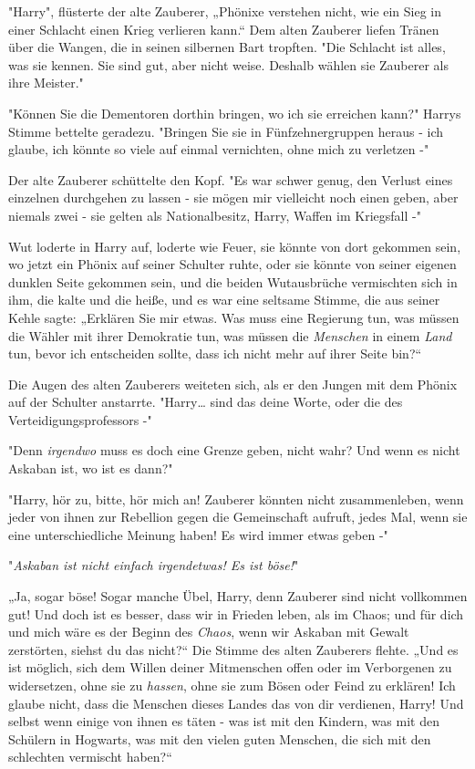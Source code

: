 {"Harry", flüsterte der alte Zauberer, „Phönixe verstehen nicht, wie ein Sieg in einer Schlacht einen Krieg verlieren kann.“ Dem alten Zauberer liefen Tränen über die Wangen, die in seinen silbernen Bart tropften. "Die Schlacht ist alles, was sie kennen. Sie sind gut, aber nicht weise. Deshalb wählen sie Zauberer als ihre Meister."

"Können Sie die Dementoren dorthin bringen, wo ich sie erreichen kann?" Harrys Stimme bettelte geradezu. "Bringen Sie sie in Fünfzehnergruppen heraus - ich glaube, ich könnte so viele auf einmal vernichten, ohne mich zu verletzen -"

Der alte Zauberer schüttelte den Kopf. "Es war schwer genug, den Verlust eines einzelnen durchgehen zu lassen - sie mögen mir vielleicht noch einen geben, aber niemals zwei - sie gelten als Nationalbesitz, Harry, Waffen im Kriegsfall -"

Wut loderte in Harry auf, loderte wie Feuer, sie könnte von dort gekommen sein, wo jetzt ein Phönix auf seiner Schulter ruhte, oder sie könnte von seiner eigenen dunklen Seite gekommen sein, und die beiden Wutausbrüche vermischten sich in ihm, die kalte und die heiße, und es war eine seltsame Stimme, die aus seiner Kehle sagte: „Erklären Sie mir etwas. Was muss eine Regierung tun, was müssen die Wähler mit ihrer Demokratie tun, was müssen die \emph{Menschen} in einem \emph{Land} tun, bevor ich entscheiden sollte, dass ich nicht mehr auf ihrer Seite bin?“

Die Augen des alten Zauberers weiteten sich, als er den Jungen mit dem Phönix auf der Schulter anstarrte. "Harry… sind das deine Worte, oder die des Verteidigungsprofessors -"

"Denn \emph{irgendwo} muss es doch eine Grenze geben, nicht wahr? Und wenn es nicht Askaban ist, wo ist es dann?"

"Harry, hör zu, bitte, hör mich an! Zauberer könnten nicht zusammenleben, wenn jeder von ihnen zur Rebellion gegen die Gemeinschaft aufruft, jedes Mal, wenn sie eine unterschiedliche Meinung haben! Es wird immer etwas geben -"

"\emph{Askaban ist nicht einfach irgendetwas! Es ist böse!}"

„Ja, sogar böse! Sogar manche Übel, Harry, denn Zauberer sind nicht vollkommen gut! Und doch ist es besser, dass wir in Frieden leben, als im Chaos; und für dich und mich wäre es der Beginn des \emph{Chaos}, wenn wir Askaban mit Gewalt zerstörten, siehst du das nicht?“ Die Stimme des alten Zauberers flehte. „Und es ist möglich, sich dem Willen deiner Mitmenschen offen oder im Verborgenen zu widersetzen, ohne sie zu \emph{hassen}, ohne sie zum Bösen oder Feind zu erklären! Ich glaube nicht, dass die Menschen dieses Landes das von dir verdienen, Harry! Und selbst wenn einige von ihnen es täten - was ist mit den Kindern, was mit den Schülern in Hogwarts, was mit den vielen guten Menschen, die sich mit den schlechten vermischt haben?“

}

